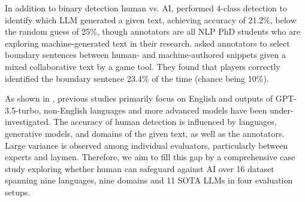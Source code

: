 In addition to binary detection human vs. AI, \citet{wang2024m4gtbench} performed 4-class detection to identify which LLM generated a given text, achieving accuracy of 21.2\%, below the random guess of 25\%, though annotators are all NLP PhD students who are exploring machine-generated text in their research. \citet{liam2023reakfake} asked annotators to select boundary sentences between human- and machine-authored snippets given a mixed collaborative text by a game tool. They found that players correctly identified the boundary sentence 23.4\% of the time (chance being 10\%).

As shown in , previous studies primarily focus on English and outputs of GPT-3.5-turbo, non-English languages and more advanced models have been under-investigated. The accuracy of human detection is influenced by languages, generative models, and domains of the given text, as well as the annotators. Large variance is observed among individual evaluators, particularly between experts and laymen.
Therefore, we aim to fill this gap by a comprehensive case study exploring whether human can safeguard against AI over 16 dataset spanning nine languages, nine domains and 11 SOTA LLMs in four evaluation setups.


